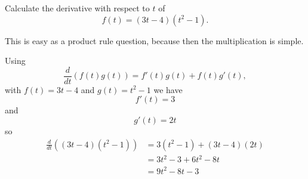 \documentclass{ximera}
\author{Emma Smith Zbarsky}
\begin{document}
\begin{exercise}

Calculate the derivative with respect to $t$ of
\[f(t) = (3t-4)(t^2-1).\]


\begin{hint}
This is easy as a product rule question, because then the multiplication
is simple.
\end{hint}


\begin{hint}
Using \[\frac{d}{dt}\left(f(t)g(t)\right) = f'(t)g(t)+f(t)g'(t),\] with
$f(t) = 3t-4$ and $g(t) = t^2-1$ we have \[f'(t) = 3\] and
\[g'(t) = 2t\] so
\begin{align*}\frac{d}{dt}\left((3t-4)(t^2-1)\right) &= 3(t^2-1)+(3t-4)(2t) \\ &= 3t^2-3+6t^2-8t \\ &= \boxed{9t^2-8t-3}\end{align*}
\end{hint}


\begin{multipleChoice}
\end{multipleChoice}

\end{exercise}
\end{document}
